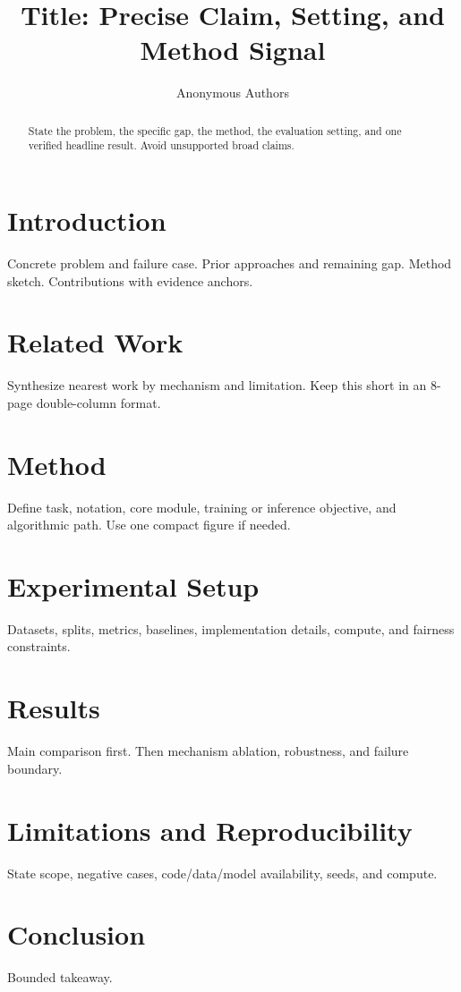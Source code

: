\documentclass[10pt,twocolumn]{article}
\title{Title: Precise Claim, Setting, and Method Signal}
\author{Anonymous Authors}
\date{}
\begin{document}
\maketitle

\begin{abstract}
State the problem, the specific gap, the method, the evaluation setting, and one verified headline result. Avoid unsupported broad claims.
\end{abstract}

\section{Introduction}
Concrete problem and failure case. Prior approaches and remaining gap. Method sketch. Contributions with evidence anchors.

\section{Related Work}
Synthesize nearest work by mechanism and limitation. Keep this short in an 8-page double-column format.

\section{Method}
Define task, notation, core module, training or inference objective, and algorithmic path. Use one compact figure if needed.

\section{Experimental Setup}
Datasets, splits, metrics, baselines, implementation details, compute, and fairness constraints.

\section{Results}
Main comparison first. Then mechanism ablation, robustness, and failure boundary.

\section{Limitations and Reproducibility}
State scope, negative cases, code/data/model availability, seeds, and compute.

\section{Conclusion}
Bounded takeaway.



\end{document}
